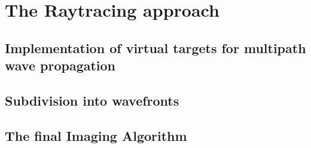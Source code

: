 
\chapter{The Raytracing approach}\label{chapter:the_raytracing_approach}

\section{Implementation of virtual targets for multipath wave propagation}

\section{Subdivision into wavefronts}

\section{The final Imaging Algorithm}
